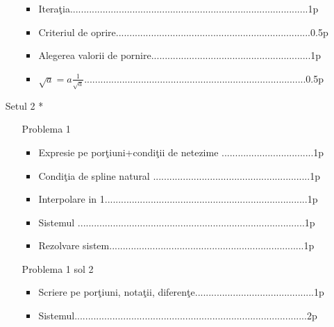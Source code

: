 \documentclass{article}%
\begin{document}
\begin{enumerate}
\begin{enumerate}
\begin{itemize}
\item Itera\c{t}ia........................................................................................1p

\item Criteriul de oprire........................................................................0.5p

\item Alegerea valorii de pornire...........................................................1p

\item $\sqrt{a}=a\frac{1}{\sqrt{a}}$..................................................................................0.5p
\end{itemize}
\end{enumerate}

\item[Setul 2] *

\begin{enumerate}
\item[Problema 1] 

\begin{itemize}
\item Expresie pe por\c{t}iuni+condi\c{t}ii de netezime ..................................1p

\item Condi\c{t}ia de spline natural ..........................................................1p

\item Interpolare in 1...........................................................................1p

\item Sistemul ....................................................................................1p

\item Rezolvare sistem........................................................................1p
\end{itemize}

\item[Problema 1 sol 2] 

\begin{itemize}
\item Scriere pe por\c{t}iuni, nota\c{t}ii, diferen\c{t}e............................................1p

\item Sistemul......................................................................................2p


\end{itemize}
\end{enumerate}
\end{enumerate}
\end{document}
